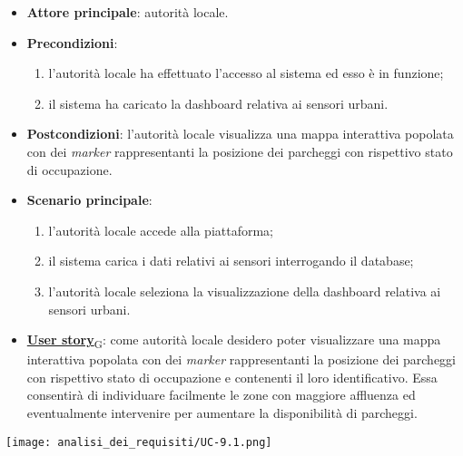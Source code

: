 \begin{itemize}
	\item \textbf{Attore principale}: autorità locale.
	\item \textbf{Precondizioni}:
	      \begin{enumerate}
		      \item l'autorità locale ha effettuato l'accesso al sistema ed esso è in funzione;
		      \item il sistema ha caricato la dashboard relativa ai sensori urbani.
	      \end{enumerate}
	\item \textbf{Postcondizioni}: l'autorità locale visualizza una mappa interattiva popolata con dei \textit{marker} rappresentanti la posizione dei parcheggi con rispettivo stato di occupazione.
	\item \textbf{Scenario principale}:
	      \begin{enumerate}
		      \item l'autorità locale accede alla piattaforma;
		      \item il sistema carica i dati relativi ai sensori interrogando il database;
		      \item l'autorità locale seleziona la visualizzazione della dashboard relativa ai sensori urbani.
	      \end{enumerate}
	\item \href{https://7last.github.io/docs/rtb/documentazione-interna/glossario\#user-story}{\textbf{User story}\textsubscript{G}}:
	      come autorità locale desidero poter visualizzare una mappa interattiva popolata con dei \textit{marker} rappresentanti la posizione dei parcheggi con rispettivo stato di occupazione
	      e contenenti il loro identificativo. Essa consentirà di individuare facilmente le zone con maggiore affluenza ed eventualmente intervenire per aumentare la disponibilità di parcheggi.
\end{itemize}
\begin{center}
	\texttt{[image: analisi\_dei\_requisiti/UC-9.1.png]}
\end{center}

